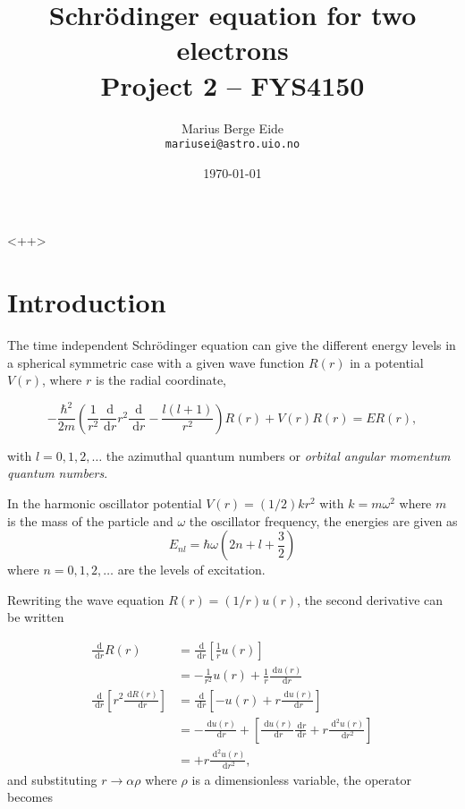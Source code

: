 \documentclass[a4paper,11pt]{article}
\date{\today}
\title{Schr\"{o}dinger equation for two electrons\\ \small{Project 2 -- FYS4150}}
\author{Marius Berge Eide \\
\texttt{mariusei@astro.uio.no}}
\newcommand{\diff}{\ensuremath{\; \text{d}}}
\begin{document}
\onecolumn
\maketitle{}

\begin{abstract}
    
\end{abstract}<++>

\section{Introduction}
The time independent Schr\"{o}dinger equation can give the different energy levels in a spherical symmetric case with a given wave function $R(r)$ in a potential $V(r)$, where $r$ is the radial coordinate,

\begin{equation}
    -\frac{\hbar^2}{2m} \left( \frac{1}{r^2} \frac{\diff}{\diff r} r^2 \frac{\diff}{\diff r} - \frac{l\left( l+1 \right)}{r^2}  \right) R(r) + V(r) R(r) = ER(r),
    \label{eq:schrodinger}
\end{equation}

with $l=0,1,2,\dots$ the azimuthal quantum numbers or \textit{orbital angular momentum quantum numbers}.

In the harmonic oscillator potential $V(r) = (1/2)kr^2$ with $k = m \omega^2$ where $m$ is the mass of the particle and $\omega$ the oscillator frequency, the energies are given as
\begin{equation}
    E_{nl} = \hbar \omega \left( 2n + l + \frac{3}{2} \right)
    \label{eq:energies}
\end{equation}
where $n=0,1,2,\dots$ are the levels of excitation.

Rewriting the wave equation $R(r) = (1/r) u(r)$, the second derivative can be written 

\begin{align*}
    \frac{\diff}{\diff r} R(r) &= \frac{\diff}{\diff r} \left[ \frac{1}{r} u(r) \right] \\
    &= -\frac{1}{r^2}u(r) + \frac{1}{r} \frac{\diff u(r)}{\diff r} \\
    \frac{\diff}{\diff r} \left[ r^2 \frac{\diff R(r)}{\diff r} \right] 
    &= \frac{\diff}{\diff r} \left[ -u(r) + r \frac{\diff u(r)}{\diff r} \right] \\
    &= -\frac{\diff u(r)}{\diff r} + \left[ \frac{\diff u(r)}{\diff r} \frac{\diff r}{\diff r} + r \frac{\diff^2 u(r)}{\diff r^2} \right] \\
    &= +r \frac{\diff^2 u(r)}{\diff r^2},
\end{align*}
and substituting $r \to \alpha \rho$ where $\rho$ is a dimensionless variable, the operator becomes
\end{document}
